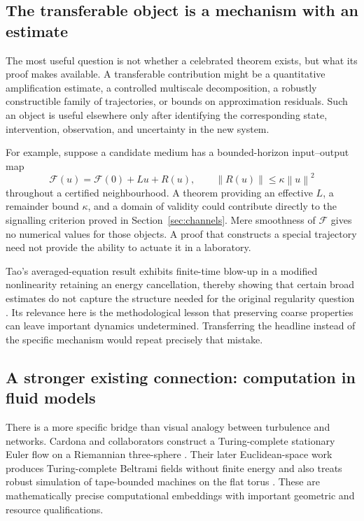 \documentclass[11pt,a4paper]{article}
\theoremstyle{definition}
\theoremstyle{remark}
\newcommand{\norm}[1]{\left\lVert#1\right\rVert}
\begin{document}
\subsection{The transferable object is a mechanism with an estimate}
The most useful question is not whether a celebrated theorem exists, but what its proof makes available. A transferable contribution might be a quantitative amplification estimate, a controlled multiscale decomposition, a robustly constructible family of trajectories, or bounds on approximation residuals. Such an object is useful elsewhere only after identifying the corresponding state, intervention, observation, and uncertainty in the new system.

For example, suppose a candidate medium has a bounded-horizon input--output map
\begin{equation}\label{eq:nonlinearIO}
 \mathcal F(u)=\mathcal F(0)+Lu+R(u),\qquad
 \norm{R(u)}\leq \kappa\norm{u}^2
\end{equation}
throughout a certified neighbourhood. A theorem providing an effective $L$, a remainder bound $\kappa$, and a domain of validity could contribute directly to the signalling criterion proved in Section~\ref{sec:channels}. Mere smoothness of $\mathcal F$ gives no numerical values for those objects. A proof that constructs a special trajectory need not provide the ability to actuate it in a laboratory.

Tao's averaged-equation result exhibits finite-time blow-up in a modified nonlinearity retaining an energy cancellation, thereby showing that certain broad estimates do not capture the structure needed for the original regularity question \citep{tao}. Its relevance here is the methodological lesson that preserving coarse properties can leave important dynamics undetermined. Transferring the headline instead of the specific mechanism would repeat precisely that mistake.

\subsection{A stronger existing connection: computation in fluid models}
There is a more specific bridge than visual analogy between turbulence and networks. Cardona and collaborators construct a Turing-complete stationary Euler flow on a Riemannian three-sphere \citep{cardona3}. Their later Euclidean-space work produces Turing-complete Beltrami fields without finite energy and also treats robust simulation of tape-bounded machines on the flat torus \citep{cardonaeuclid}. These are mathematically precise computational embeddings with important geometric and resource qualifications.
\end{document}

